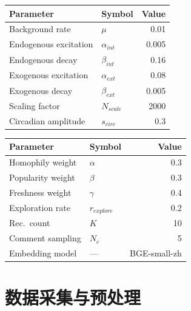 \documentclass[a4paper,fleqn]{cas-dc}
\begin{document}
\noindent
\begin{minipage}[t]{\columnwidth}
\centering
{}
\label{tab:hawkes_params}
\small
\renewcommand{\arraystretch}{1.15}
\begin{tabular}{@{}llr@{}}
\toprule
\textbf{Parameter} & \textbf{Symbol} & \textbf{Value} \\
\midrule
Background rate & $\mu$ & 0.01 \\
Endogenous excitation & $\alpha_{int}$ & 0.005 \\
Endogenous decay & $\beta_{int}$ & 0.16 \\
Exogenous excitation & $\alpha_{ext}$ & 0.08 \\
Exogenous decay & $\beta_{ext}$ & 0.005 \\
Scaling factor & $N_{scale}$ & 2000 \\
Circadian amplitude & $s_{circ}$ & 0.3 \\
\bottomrule
\end{tabular}
\end{minipage}

\vspace{6pt}
\noindent
\begin{minipage}[t]{\columnwidth}
\centering
{}
\label{tab:rec_params}
\small
\renewcommand{\arraystretch}{1.15}
\begin{tabular}{@{}llr@{}}
\toprule
\textbf{Parameter} & \textbf{Symbol} & \textbf{Value} \\
\midrule
Homophily weight & $\alpha$ & 0.3 \\
Popularity weight & $\beta$ & 0.3 \\
Freshness weight & $\gamma$ & 0.4 \\
Exploration rate & $r_{explore}$ & 0.2 \\
Rec.\ count & $K$ & 10 \\
Comment sampling & $N_c$ & 5 \\
Embedding model & --- & BGE-small-zh \\
\bottomrule
\end{tabular}
\end{minipage}

\section{数据采集与预处理}
\label{app:data}
\end{document}
